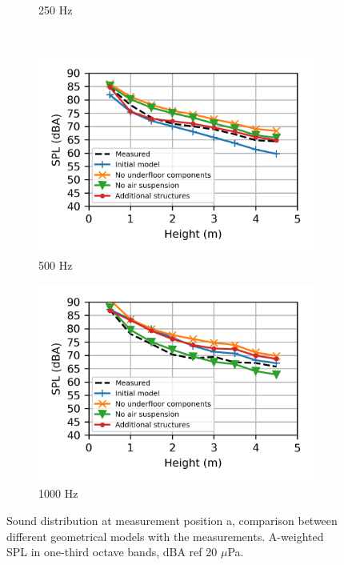 \begin{figure}[H]
\begin{subfigure}[b]{0.49\textwidth}
		\caption{250 Hz}
	\end{subfigure}
	\\
	\begin{subfigure}[b]{0.49\textwidth}
		\centering
		\includegraphics{fig/chap5/geometry_variation/third_octave_over_height/500_Hz.png}
		\caption{500 Hz}
	\end{subfigure}
	\hfill
	\begin{subfigure}[b]{0.49\textwidth}
		\centering
		\includegraphics{fig/chap5/geometry_variation/third_octave_over_height/1000_Hz.png}
		\caption{1000 Hz}
	\end{subfigure}
	\caption{Sound distribution at measurement position a, comparison between different geometrical models with the measurements. A-weighted SPL in one-third octave bands, dBA ref 20 $\mu$Pa.}
	\label{fig:third_octave_over_height_geometry_variation}
\end{figure}


